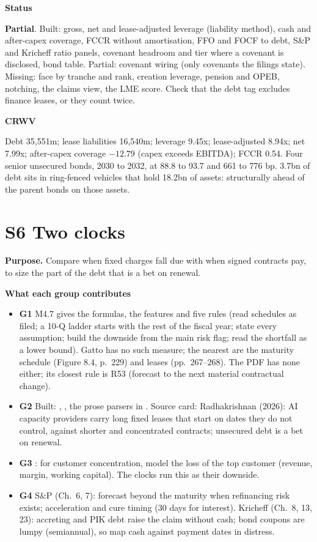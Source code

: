 \documentclass[11pt]{article}
\newcommand{\stpartial}{\textcolor{warn}{\textbf{Partial}}}
\newcommand{\GA}{\textcolor{gA}{\textbf{G1}}}
\newcommand{\GB}{\textcolor{gB}{\textbf{G2}}}
\newcommand{\GC}{\textcolor{gC}{\textbf{G3}}}
\newcommand{\GD}{\textcolor{gD}{\textbf{G4}}}
\newcommand{\fld}[1]{\par\medskip\noindent\textbf{\textcolor{steel}{#1}}\par\nopagebreak}
\begin{document}
\fld{Status} \stpartial. Built: gross, net and lease-adjusted leverage (liability method), cash and after-capex coverage, FCCR without amortisation, FFO and FOCF to debt, S\&P and Kricheff ratio panels, covenant headroom and tier where a covenant is disclosed, bond table. Partial: covenant wiring (only covenants the filings state). Missing: face by tranche and rank, creation leverage, pension and OPEB, notching, the claims view, the LME score. Check that the debt tag excludes finance leases, or they count twice.

\fld{CRWV} Debt 35,551m; lease liabilities 16,540m; leverage 9.45x; lease-adjusted 8.94x; net 7.99x; after-capex coverage $-12.79$ (capex exceeds EBITDA); FCCR 0.54. Four senior unsecured bonds, 2030 to 2032, at 88.8 to 93.7 and 661 to 776 bp. 3.7bn of debt sits in ring-fenced vehicles that hold 18.2bn of assets: structurally ahead of the parent bonds on those assets.
\section{S6 Two clocks}\label{s6}

\textbf{Purpose.} Compare when fixed charges fall due with when signed contracts pay, to size the part of the debt that is a bet on renewal.

\fld{What each group contributes}
\begin{itemize}
\item \GA{} M4.7 gives the formulas, the features and five rules (read schedules as filed; a 10-Q ladder starts with the rest of the fiscal year; state every assumption; build the downside from the main risk flag; read the shortfall as a lower bound). Gatto has no such measure; the nearest are the maturity schedule (Figure 8.4, p.~229) and leases (pp.~267--268). The PDF has none either; its closest rule is R53 (forecast to the next material contractual change).
\item \GB{} Built: , , the prose parsers in . Source card: Radhakrishnan (2026): AI capacity providers carry long fixed leases that start on dates they do not control, against shorter and concentrated contracts; unsecured debt is a bet on renewal.
\item \GC{} : for customer concentration, model the loss of the top customer (revenue, margin, working capital). The clocks run this as their downside.
\item \GD{} S\&P (Ch.~6, 7): forecast beyond the maturity when refinancing risk exists; acceleration and cure timing (30 days for interest). Kricheff (Ch.~8, 13, 23): accreting and PIK debt raise the claim without cash; bond coupons are lumpy (semiannual), so map cash against payment dates in distress.
\end{itemize}
\end{document}
